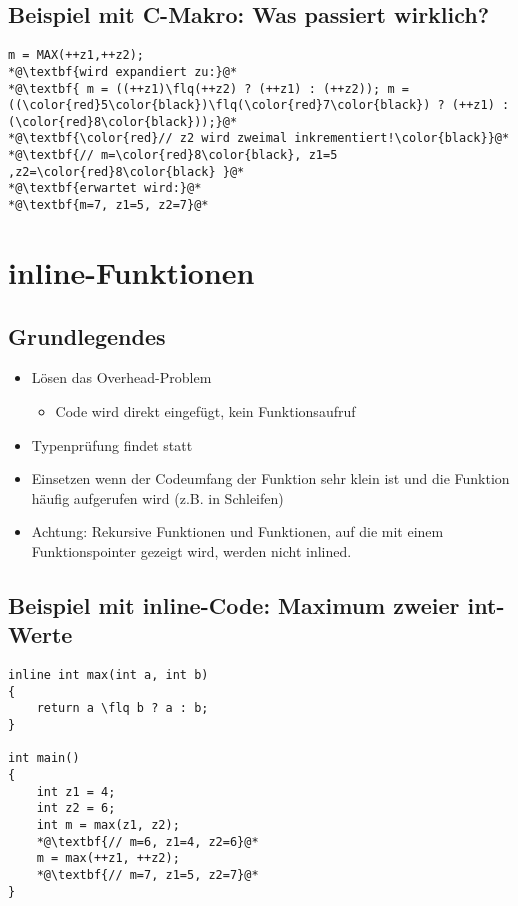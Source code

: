 \subsection{Beispiel mit C-Makro: Was passiert wirklich?}
\label{sec:Beispiel mit C-Makro: Was passiert wirklich?}
\noindent
\begin{minipage}{\linewidth}
\begin{lstlisting}
m = MAX(++z1,++z2);
*@\textbf{wird expandiert zu:}@*
*@\textbf{ m = ((++z1)\flq(++z2) ? (++z1) : (++z2)); m = ((\color{red}5\color{black})\flq(\color{red}7\color{black}) ? (++z1) : (\color{red}8\color{black}));}@*
*@\textbf{\color{red}// z2 wird zweimal inkrementiert!\color{black}}@*
*@\textbf{// m=\color{red}8\color{black}, z1=5 ,z2=\color{red}8\color{black} }@*
*@\textbf{erwartet wird:}@*
*@\textbf{m=7, z1=5, z2=7}@*
\end{lstlisting}
\end{minipage}


\section{inline-Funktionen}
\label{sec:inline-Funktionen}

\subsection{Grundlegendes}
\label{sec:inline-Funktionen: Grundlegendes}
\begin{itemize}
	\item Lösen das Overhead-Problem
	\begin{itemize}
		\item Code wird direkt eingefügt, kein Funktionsaufruf
	\end{itemize}
	\item Typenprüfung findet statt
	\item Einsetzen wenn der Codeumfang der Funktion sehr klein ist und die Funktion häufig aufgerufen wird (z.B. in Schleifen)
	\item Achtung: Rekursive Funktionen und Funktionen, auf die mit einem Funktionspointer gezeigt wird, werden nicht inlined.
\end{itemize}

\subsection{Beispiel mit inline-Code: Maximum zweier int-Werte}
\label{sec:Beispiel mit inline-Code: Maximum zweier int-Werte}
\noindent
\begin{minipage}{\linewidth}
\begin{lstlisting}
inline int max(int a, int b)
{
	return a \flq b ? a : b;
}

int main()
{
	int z1 = 4;
	int z2 = 6;
	int m = max(z1, z2);
	*@\textbf{// m=6, z1=4, z2=6}@*
	m = max(++z1, ++z2);
	*@\textbf{// m=7, z1=5, z2=7}@*
}
\end{lstlisting}
\end{minipage}

